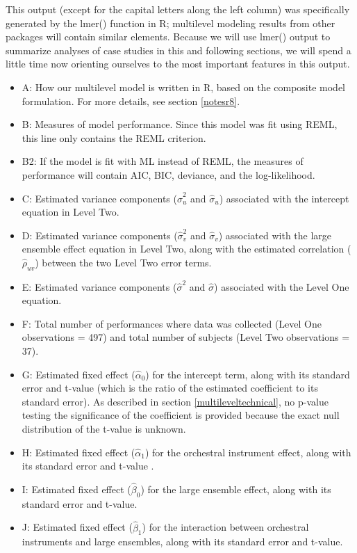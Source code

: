 \documentclass[
]{krantz}
\providecommand{\tightlist}{%
  \setlength{\itemsep}{0pt}\setlength{\parskip}{0pt}}
\begin{document}
This output (except for the capital letters along the left column) was specifically generated by the lmer() function in R; multilevel modeling results from other packages will contain similar elements. Because we will use lmer() output to summarize analyses of case studies in this and following sections, we will spend a little time now orienting ourselves to the most important features in this output.

\begin{itemize}
\tightlist
\item
  A: How our multilevel model is written in R, based on the composite model formulation. For more details, see section \ref{notesr8}.
\item
  B: Measures of model performance. Since this model was fit using REML, this line only contains the REML criterion.
\item
  B2: If the model is fit with ML instead of REML, the measures of performance will contain AIC, BIC, deviance, and the log-likelihood.
\item
  C: Estimated variance components (\(\hat{\sigma}_{u}^2\) and \(\hat{\sigma}_{u}\)) associated with the intercept equation in Level Two.
\item
  D: Estimated variance components (\(\hat{\sigma}_{v}^2\) and \(\hat{\sigma}_{v}\)) associated with the large ensemble effect equation in Level Two, along with the estimated correlation (\(\hat{\rho}_{uv}\)) between the two Level Two error terms.
\item
  E: Estimated variance components (\(\hat{\sigma}^2\) and \(\hat{\sigma}\)) associated with the Level One equation.
\item
  F: Total number of performances where data was collected (Level One observations = 497) and total number of subjects (Level Two observations = 37).
\item
  G: Estimated fixed effect (\(\hat{\alpha}_{0}\)) for the intercept term, along with its standard error and t-value (which is the ratio of the estimated coefficient to its standard error). As described in section \ref{multileveltechnical}, no p-value testing the significance of the coefficient is provided because the exact null distribution of the t-value is unknown.
\item
  H: Estimated fixed effect (\(\hat{\alpha}_{1}\)) for the orchestral instrument effect, along with its standard error and t-value .
\item
  I: Estimated fixed effect (\(\hat{\beta}_{0}\)) for the large ensemble effect, along with its standard error and t-value.
\item
  J: Estimated fixed effect (\(\hat{\beta}_{1}\)) for the interaction between orchestral instruments and large ensembles, along with its standard error and t-value.
\end{itemize}
\end{document}
